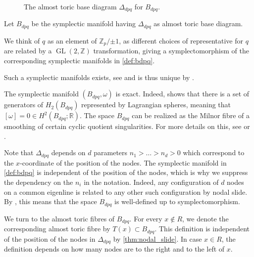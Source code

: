 \documentclass[12pt,a4paper,abstract=true,draft]{scrartcl}
\DeclareMathOperator{\GL}{GL}
\begin{document}
\begin{figure}
\centering
{}   
\caption{The almost toric base diagram $Δ_{dpq}$ for $B_{dpq}$.}
\label{fig:Bdpq_moment_image}
\end{figure}

\begin{definition}
    \label{def:bdpq}
    Let $B_{dpq}$ be the symplectic manifold having $\Delta_{dpq}$ as almost toric base diagram.
\end{definition}

We think of $q$ as an element of $ℤ_p/{±1}$, as different choices of representative for $q$ are related by a $\GL(2,ℤ)$ transformation, giving a symplectomorphism of the corresponding symplectic manifolds in \cref{def:bdpq}.

Such a symplectic manifolds exists, see \cite[Section 7.4]{evans2021atfs} and is thus unique by \cite[Theorem 8.5]{evans2021atfs}. 

\begin{remark}
    The symplectic manifold $(B_{dpq}, \omega)$ is exact.
    Indeed, \cite[Lemma 7.11]{evans2021atfs} shows that there is a set of generators of $H_2(B_{dpq})$ represented by Lagrangian spheres, meaning that $[\omega] = 0 \in H^2(B_{dpq};\mathbb{R})$.
The space $B_{dpq}$ can be realized as the Milnor fibre of a smoothing of certain cyclic quotient singularities.
For more details on this, see \cite[Section 7.4]{evans2021atfs} or \cite{Eva19}.
\end{remark}

Note that $\Delta_{dpq}$ depends on $d$ parameters $n_1>\ldots>n_d > 0$ which correspond to the $x$-coordinate of the position of the nodes.
The symplectic manifold in \cref{def:bdpq} is independent of the position of the nodes, which is why we suppress the dependency on the $n_i$ in the notation.
Indeed, any configuration of $d$ nodes on a common eigenline is related to any other such configuration by nodal slide.
By \cite[Theorem 8.10]{evans2021atfs}, this means that the space $B_{dpq}$ is well-defined up to symplectomorphism.

We turn to the almost toric fibres of $B_{dpq}$.
For every $x \notin R$, we denote the corresponding almost toric fibre by $T(x) \subset B_{dpq}$.
This definition is independent of the position of the nodes in $\Delta_{dpq}$ by \cref{thm:nodal_slide}.
In case $x \in R$, the definition depends on how many nodes are to the right and to the left of $x$.
\end{document}
